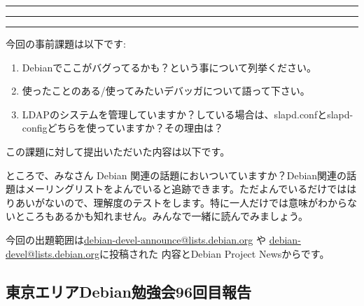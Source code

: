 \documentclass[mingoth,a4paper]{jsarticle}
\begin{document}
\newpage

\begin{minipage}[b]{0.2\hsize}
 \colorbox{titleback}{}
\end{minipage}
\begin{minipage}[b]{0.8\hsize}
\hrule
\vspace{2mm}
\hrule
\begin{multicols}{2}
\tableofcontents
\end{multicols}
\vspace{2mm}
\hrule
\end{minipage}


今回の事前課題は以下です:
\begin{enumerate}
 \item Debianでここがバグってるかも？という事について列挙ください。
 \item 使ったことのある/使ってみたいデバッガについて語って下さい。
 \item LDAPのシステムを管理していますか？している場合は、slapd.confとslapd-configどちらを使っていますか？その理由は？
\end{enumerate}
この課題に対して提出いただいた内容は以下です。
\begin{multicols}{2}
{\small
 
}
\end{multicols}


ところで、みなさん Debian 関連の話題においついていますか？Debian関連の話
題はメーリングリストをよんでいると追跡できます。ただよんでいるだけではは
りあいがないので、理解度のテストをします。特に一人だけでは意味がわからな
いところもあるかも知れません。みんなで一緒に読んでみましょう。

今回の出題範囲は\url{debian-devel-announce@lists.debian.org} や \url{debian-devel@lists.debian.org}に投稿された
内容とDebian Project Newsからです。

\begin{multicols}{2}
 
\end{multicols}

\subsection{東京エリアDebian勉強会96回目報告}
\end{document}
